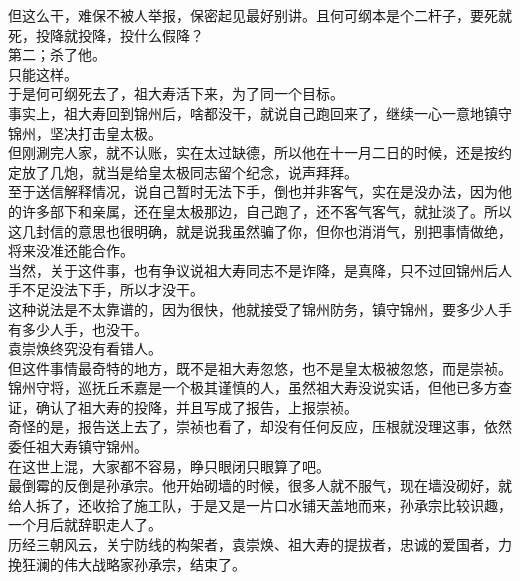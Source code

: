 \begin{multicols}{\theparacolNo}
但这么干，难保不被人举报，保密起见最好别讲。且何可纲本是个二杆子，要死就死，投降就投降，投什么假降？\\

第二；杀了他。\\

只能这样。\\

于是何可纲死去了，祖大寿活下来，为了同一个目标。\\

事实上，祖大寿回到锦州后，啥都没干，就说自己跑回来了，继续一心一意地镇守锦州，坚决打击皇太极。\\

但刚涮完人家，就不认账，实在太过缺德，所以他在十一月二日的时候，还是按约定放了几炮，就当是给皇太极同志留个纪念，说声拜拜。\\

至于送信解释情况，说自己暂时无法下手，倒也并非客气，实在是没办法，因为他的许多部下和亲属，还在皇太极那边，自己跑了，还不客气客气，就扯淡了。所以这几封信的意思也很明确，就是说我虽然骗了你，但你也消消气，别把事情做绝，将来没准还能合作。\\

当然，关于这件事，也有争议说祖大寿同志不是诈降，是真降，只不过回锦州后人手不足没法下手，所以才没干。\\

这种说法是不太靠谱的，因为很快，他就接受了锦州防务，镇守锦州，要多少人手有多少人手，也没干。\\

袁崇焕终究没有看错人。\\

但这件事情最奇特的地方，既不是祖大寿忽悠，也不是皇太极被忽悠，而是崇祯。\\

锦州守将，巡抚丘禾嘉是一个极其谨慎的人，虽然祖大寿没说实话，但他已多方查证，确认了祖大寿的投降，并且写成了报告，上报崇祯。\\

奇怪的是，报告送上去了，崇祯也看了，却没有任何反应，压根就没理这事，依然委任祖大寿镇守锦州。\\

在这世上混，大家都不容易，睁只眼闭只眼算了吧。\\

最倒霉的反倒是孙承宗。他开始砌墙的时候，很多人就不服气，现在墙没砌好，就给人拆了，还收拾了施工队，于是又是一片口水铺天盖地而来，孙承宗比较识趣，一个月后就辞职走人了。\\

历经三朝风云，关宁防线的构架者，袁崇焕、祖大寿的提拔者，忠诚的爱国者，力挽狂澜的伟大战略家孙承宗，结束了。\\


\end{multicols}
